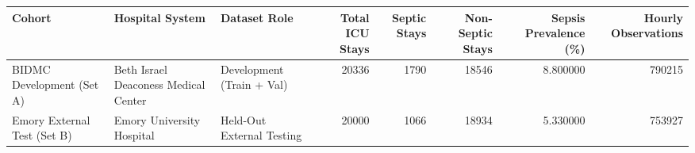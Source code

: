 \begin{tabular}{lllrrrrr}
\toprule
Cohort & Hospital System & Dataset Role & Total ICU Stays & Septic Stays & Non-Septic Stays & Sepsis Prevalence (\%) & Hourly Observations \\
\midrule
BIDMC Development (Set A) & Beth Israel Deaconess Medical Center & Development (Train + Val) & 20336 & 1790 & 18546 & 8.800000 & 790215 \\
Emory External Test (Set B) & Emory University Hospital & Held-Out External Testing & 20000 & 1066 & 18934 & 5.330000 & 753927 \\
\bottomrule
\end{tabular}
